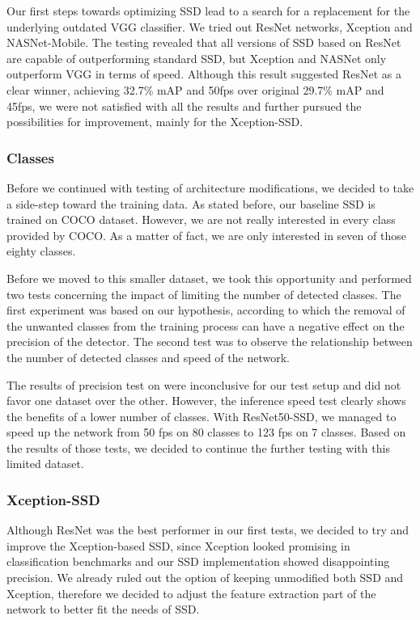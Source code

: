 Our first steps towards optimizing SSD lead to a search for a replacement for the underlying outdated VGG classifier. We tried out ResNet networks, Xception and NASNet-Mobile. The testing revealed that all versions of SSD based on ResNet are capable of outperforming standard SSD, but Xception and NASNet only outperform VGG in terms of speed. Although this result suggested ResNet as a clear winner, achieving 32.7\% mAP and 50fps over original 29.7\% mAP and 45fps, we were not satisfied with all the results and further pursued the possibilities for improvement, mainly for the Xception-SSD. 

\subsubsection*{Classes}
Before we continued with testing of architecture modifications, we decided to take a side-step toward the training data. As stated before, our baseline SSD is trained on COCO dataset. However, we are not really interested in every class provided by COCO. As a matter of fact, we are only interested in seven of those eighty classes.

Before we moved to this smaller dataset, we took this opportunity and performed two tests concerning the impact of limiting the number of detected classes. The first experiment was based on our hypothesis, according to which the removal of the unwanted classes from the training process can have a negative effect on the precision of the detector. The second test was to observe the relationship between the number of detected classes and speed of the network.

The results of precision test on were inconclusive for our test setup and did not favor one dataset over the other. However, the inference speed test clearly shows the benefits of a lower number of classes. With ResNet50-SSD, we managed to speed up the network from 50 fps on 80 classes to 123 fps on 7 classes. Based on the results of those tests, we decided to continue the further testing with this limited dataset.

\subsubsection*{Xception-SSD}
Although ResNet was the best performer in our first tests, we decided to try and improve the Xception-based SSD, since Xception looked promising in classification benchmarks and our SSD implementation showed disappointing precision. We already ruled out the option of keeping unmodified both SSD and Xception, therefore we decided to adjust the feature extraction part of the network to better fit the needs of SSD.

